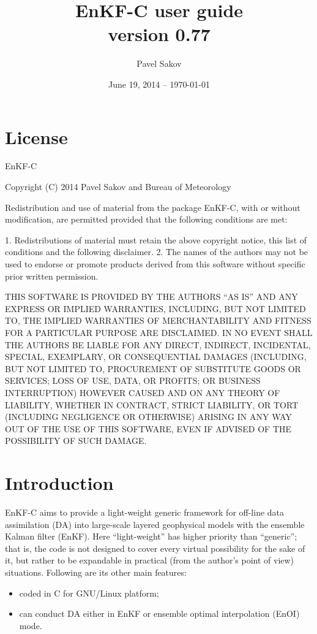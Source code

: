 \documentclass[11pt]{report}
\begin{document}
\title{EnKF-C user guide\\{\normalsize version 0.77}}

\author{Pavel Sakov}
\date{June 19, 2014 -- \today}

\maketitle
\thispagestyle{empty}

\clearpage

\tableofcontents

\clearpage

\chapter*{License}

EnKF-C

Copyright (C) 2014 Pavel Sakov and Bureau of Meteorology

Redistribution and use of material from the package EnKF-C, with or without
modification, are permitted provided that the following conditions are 
met:

   1. Redistributions of material must retain the above copyright notice, this
      list of conditions and the following disclaimer.
   2. The names of the authors may not be used to endorse or promote products
      derived from this software without specific prior written permission.

THIS SOFTWARE IS PROVIDED BY THE AUTHORS ``AS IS'' AND ANY EXPRESS OR IMPLIED 
WARRANTIES, INCLUDING, BUT NOT LIMITED TO, THE IMPLIED WARRANTIES OF
MERCHANTABILITY AND FITNESS FOR A PARTICULAR PURPOSE ARE DISCLAIMED. IN NO
EVENT SHALL THE AUTHORS BE LIABLE FOR ANY DIRECT, INDIRECT, INCIDENTAL, SPECIAL,
EXEMPLARY, OR CONSEQUENTIAL DAMAGES (INCLUDING, BUT NOT LIMITED TO, PROCUREMENT
OF SUBSTITUTE GOODS OR SERVICES; LOSS OF USE, DATA, OR PROFITS; OR BUSINESS
INTERRUPTION) HOWEVER CAUSED AND ON ANY THEORY OF LIABILITY, WHETHER IN
CONTRACT, STRICT LIABILITY, OR TORT (INCLUDING NEGLIGENCE OR OTHERWISE) ARISING
IN ANY WAY OUT OF THE USE OF THIS SOFTWARE, EVEN IF ADVISED OF THE POSSIBILITY
OF SUCH DAMAGE.

\chapter{Introduction}

EnKF-C aims to provide a light-weight generic framework for off-line data assimilation (DA) into large-scale layered geophysical models with the ensemble Kalman filter (EnKF).
Here ``light-weight'' has higher priority than ``generic''; that is, the code is not designed to cover every virtual possibility for the sake of it, but rather to be expandable in practical (from the author's point of view) situations.
Following are its other main features:
\begin{itemize}
\item coded in C for GNU/Linux platform;
\item can conduct DA either in EnKF or ensemble optimal interpolation (EnOI) mode.
\end{itemize}
\end{document}
